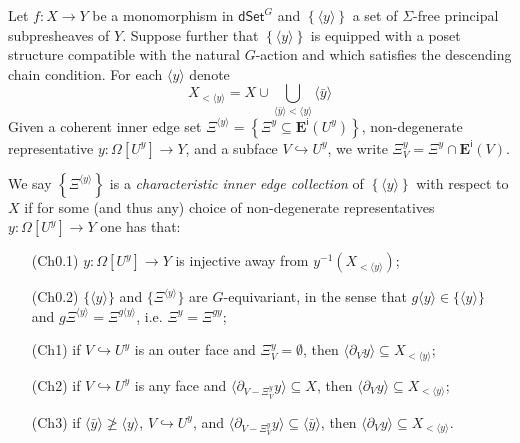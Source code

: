 \documentclass[a4paper,10pt
,draft
]{article}%
\renewcommand{\1}{\eta}%
\begin{document}
\begin{definition}\label{CHAREDGE DEF}
Let $f\colon X \to Y$ be a monomorphism in 
$\mathsf{dSet}^G$ and 
$\left\{ \langle y \rangle\right\}$
a set of $\Sigma$-free principal subpresheaves of $Y$. 
Suppose further that 
$\left\{ \langle y \rangle \right\}$ is equipped 
with a poset structure compatible with the natural $G$-action
and which satisfies the descending chain condition.
For each $\langle y \rangle$ denote
\[
X_{< \langle y \rangle} = X \cup 
\bigcup_{\langle\bar{y}\rangle < \langle y \rangle} \langle \bar{y} \rangle
\]
Given a coherent inner edge set 
$
\Xi^{\langle y \rangle} =
\left\{ \Xi^y \subseteq \boldsymbol{E}^{\mathsf{i}}(U^y)\right\}$,
non-degenerate representative
$y \colon \Omega[U^y] \to Y$, and a subface $V \hookrightarrow U^y$,
we write
$\Xi^y_V = \Xi^y \cap \boldsymbol{E}^{\mathsf{i}}(V)$.

We say
$
\left\{ \Xi^{\langle y \rangle} \right \} 
$
is a \emph{characteristic inner edge collection} 
of $\left\{ \langle y \rangle \right\}$ with respect to $X$ if
for some (and thus any) choice of non-degenerate representatives
$y\colon \Omega[U^y] \to Y$ one has that:
\begin{enumerate}
\item[(Ch0.1)] $y \colon \Omega[U^y] \to Y$ is injective away from
$y^{-1}\left( X_{< \langle y \rangle} \right)$; 
\item[(Ch0.2)]
$\{\langle y\rangle\}$ and
$\{\Xi^{\langle y \rangle}\}$ are $G$-equivariant, in the sense that
$g\langle y\rangle \in \{\langle y\rangle\}$ and 
$g \Xi^{\langle y \rangle} =
\Xi^{g \langle y \rangle}$,
i.e. $\Xi^y = \Xi^{gy}$;
\item[(Ch1)] if $V \hookrightarrow U^y$ is an outer face and $\Xi^y_V = \emptyset$,
then $\langle \partial_V y \rangle \subseteq X_{< \langle y \rangle}$;
\item[(Ch2)] if $V \hookrightarrow U^y$ is any face and
$\langle \partial_{V-\Xi^y_V} y\rangle \subseteq X$,
then
$\langle \partial_V y\rangle \subseteq X_{< \langle y \rangle}$;
\item[(Ch3)] if $\langle \bar{y} \rangle \not \geq \langle y \rangle$,
$V \hookrightarrow U^y$,
and
$\langle \partial_{V-\Xi^y_V} y\rangle \subseteq \langle \bar{y} \rangle$,
then
$\langle \partial_V y\rangle \subseteq X_{< \langle y \rangle}$.
\end{enumerate}
\end{definition}
\end{document}
